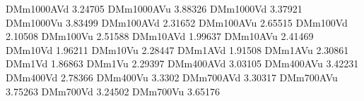 DMm1000AVd 3.24705
DMm1000AVu 3.88326
DMm1000Vd 3.37921
DMm1000Vu 3.83499
DMm100AVd 2.31652
DMm100AVu 2.65515
DMm100Vd 2.10508
DMm100Vu 2.51588
DMm10AVd 1.99637
DMm10AVu 2.41469
DMm10Vd 1.96211
DMm10Vu 2.28447
DMm1AVd 1.91508
DMm1AVu 2.30861
DMm1Vd 1.86863
DMm1Vu 2.29397
DMm400AVd 3.03105
DMm400AVu 3.42231
DMm400Vd 2.78366
DMm400Vu 3.3302
DMm700AVd 3.30317
DMm700AVu 3.75263
DMm700Vd 3.24502
DMm700Vu 3.65176
